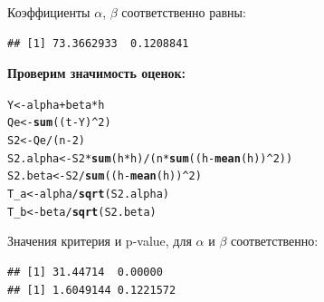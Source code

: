 \documentclass{article}\usepackage[]{graphicx}\usepackage[]{color}
\makeatletter
\newcommand{\hlnum}[1]{\textcolor[rgb]{0.686,0.059,0.569}{#1}}%
\newcommand{\hlopt}[1]{\textcolor[rgb]{0,0,0}{#1}}%
\newcommand{\hlstd}[1]{\textcolor[rgb]{0.345,0.345,0.345}{#1}}%
\newcommand{\hlkwb}[1]{\textcolor[rgb]{0.69,0.353,0.396}{#1}}%
\newcommand{\hlkwd}[1]{\textcolor[rgb]{0.737,0.353,0.396}{\textbf{#1}}}%
\newenvironment{kframe}{%
 \def\at@end@of@kframe{}%
 \ifinner\ifhmode%
  \def\at@end@of@kframe{\end{minipage}}%
  \begin{minipage}{\columnwidth}%
 \fi\fi%
 \def\FrameCommand##1{\hskip\@totalleftmargin \hskip-\fboxsep
 \colorbox{shadecolor}{##1}\hskip-\fboxsep
     \hskip-\linewidth \hskip-\@totalleftmargin \hskip\columnwidth}%
 \MakeFramed {\advance\hsize-\width
   \@totalleftmargin\z@ \linewidth\hsize
   \@setminipage}}%
 {\par\unskip\endMakeFramed%
 \at@end@of@kframe}
\newenvironment{knitrout}{}{} %
\makeatother
\begin{document}
Коэффициенты $\alpha$, $\beta$ соответственно равны:
\begin{knitrout}
\color{fgcolor}\begin{kframe}
\begin{verbatim}
## [1] 73.3662933  0.1208841
\end{verbatim}
\end{kframe}
\end{knitrout}
\textbf{Проверим значимость оценок:}
\begin{knitrout}
\color{fgcolor}\begin{kframe}
\begin{alltt}
\hlstd{Y} \hlkwb{<-} \hlstd{alpha} \hlopt{+} \hlstd{beta} \hlopt{*} \hlstd{h}
\hlstd{Qe} \hlkwb{<-} \hlkwd{sum}\hlstd{((t} \hlopt{-} \hlstd{Y)}\hlopt{^}\hlnum{2}\hlstd{)}
\hlstd{S2} \hlkwb{<-} \hlstd{Qe} \hlopt{/} \hlstd{(n} \hlopt{-} \hlnum{2}\hlstd{)}
\hlstd{S2.alpha} \hlkwb{<-} \hlstd{S2} \hlopt{*} \hlkwd{sum}\hlstd{(h} \hlopt{*} \hlstd{h)} \hlopt{/} \hlstd{(n} \hlopt{*} \hlkwd{sum}\hlstd{((h} \hlopt{-} \hlkwd{mean}\hlstd{(h))}\hlopt{^}\hlnum{2}\hlstd{))}
\hlstd{S2.beta} \hlkwb{<-} \hlstd{S2} \hlopt{/} \hlkwd{sum}\hlstd{((h} \hlopt{-} \hlkwd{mean}\hlstd{(h))}\hlopt{^}\hlnum{2}\hlstd{)}
\hlstd{T_a} \hlkwb{<-} \hlstd{alpha} \hlopt{/} \hlkwd{sqrt}\hlstd{(S2.alpha)}
\hlstd{T_b} \hlkwb{<-} \hlstd{beta} \hlopt{/} \hlkwd{sqrt}\hlstd{(S2.beta)}
\end{alltt}
\end{kframe}
\end{knitrout}
Значения критерия и p-value, для $\alpha$ и $\beta$ соответственно:
\begin{knitrout}
\color{fgcolor}\begin{kframe}
\begin{verbatim}
## [1] 31.44714  0.00000
## [1] 1.6049144 0.1221572
\end{verbatim}
\end{kframe}
\end{knitrout}
\end{document}
